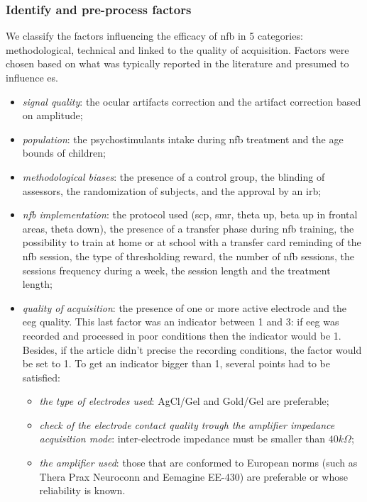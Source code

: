 \subsubsection{Identify and pre-process factors}

We classify the factors influencing the efficacy of \gls{nfb} in 5 categories: methodological, technical and linked to the quality of acquisition.
Factors were chosen based on what was typically reported in the literature and presumed to influence \gls{es}.
\begin{itemize}
\item \textit{signal quality}: the ocular artifacts correction and the artifact correction based on amplitude; 
\item \textit{population}: the psychostimulants intake during \gls{nfb} treatment and the age bounds of children;
\item \textit{methodological biases}: the presence of a control group, the blinding of assessors, 
the randomization of subjects, and the approval by an \gls{irb};
\item \textit{\gls{nfb} implementation}: the protocol used (\gls{scp}, \gls{smr}, 
theta up, beta up in frontal areas, theta down), the presence of a transfer phase during \gls{nfb} training, the possibility to train at home 
or at school with a transfer card reminding of the \gls{nfb} session, 
the type of thresholding reward, the number of \gls{nfb} sessions, the sessions frequency during a week, the session length and the treatment length;
\item \textit{quality of acquisition}: the presence of one or more active electrode and the \gls{eeg} quality. 
This last factor was an indicator between 1 and 3: if \gls{eeg} was recorded and processed in poor conditions then the indicator would be 1. 
Besides, if the article didn't precise the recording conditions, the factor would be set to 1. To get an indicator bigger than 1, several 
points had to be satisfied:
\begin{itemize}
  \item \textit{the type of electrodes used}: AgCl/Gel and Gold/Gel are preferable;
  \item \textit{check of the electrode contact quality trough the amplifier impedance acquisition mode}: inter-electrode impedance must be smaller than $ 40k \Omega$;  
\item \textit{the amplifier used}: those that are conformed to European norms (such as Thera Prax \textregistered 
Neuroconn and Eemagine EE-430) are preferable or whose reliability is known.
\end{itemize}
\end{itemize}

